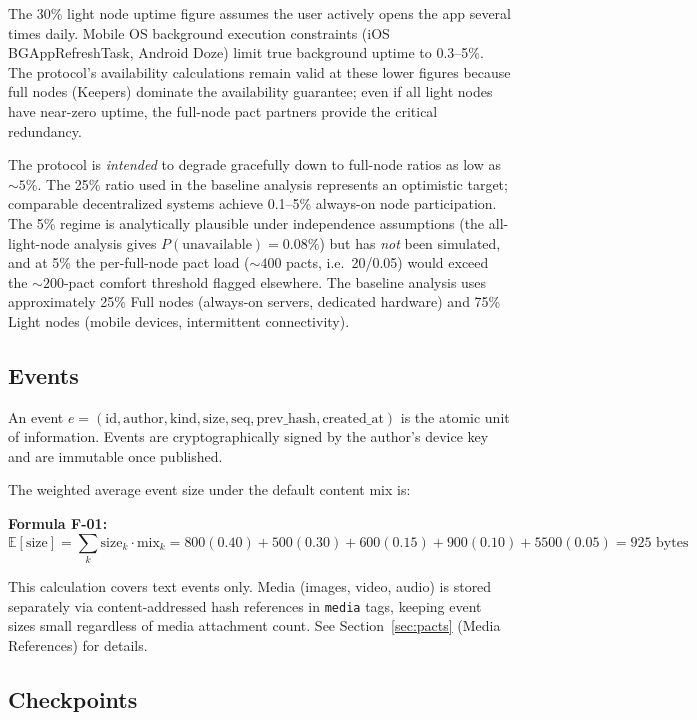 \documentclass[11pt,a4paper]{article}
\begin{document}
The 30\% light node uptime figure assumes the user actively opens the app several times daily. Mobile OS background execution constraints (iOS BGAppRefreshTask, Android Doze) limit true background uptime to 0.3--5\%. The protocol's availability calculations remain valid at these lower figures because full nodes (Keepers) dominate the availability guarantee; even if all light nodes have near-zero uptime, the full-node pact partners provide the critical redundancy.

The protocol is \emph{intended} to degrade gracefully down to full-node ratios as low as ${\sim}5\%$. The 25\% ratio used in the baseline analysis represents an optimistic target; comparable decentralized systems achieve 0.1--5\% always-on node participation. The 5\% regime is analytically plausible under independence assumptions (the all-light-node analysis gives $P(\text{unavailable}) = 0.08\%$) but has \emph{not} been simulated, and at 5\% the per-full-node pact load (${\sim}400$ pacts, i.e.\ 20/0.05) would exceed the ${\sim}200$-pact comfort threshold flagged elsewhere. The baseline analysis uses approximately 25\% Full nodes (always-on servers, dedicated hardware) and 75\% Light nodes (mobile devices, intermittent connectivity).

\subsection{Events}

An event $e = (\text{id}, \text{author}, \text{kind}, \text{size}, \text{seq}, \text{prev\_hash}, \text{created\_at})$ is the atomic unit of information. Events are cryptographically signed by the author's device key and are immutable once published.

The weighted average event size under the default content mix is:

\textbf{Formula F-01:}
\begin{equation}
  \mathbb{E}[\text{size}] = \sum_{k} \text{size}_k \cdot \text{mix}_k = 800(0.40) + 500(0.30) + 600(0.15) + 900(0.10) + 5500(0.05) = 925 \text{ bytes}
\end{equation}

This calculation covers text events only. Media (images, video, audio) is stored separately via content-addressed hash references in \texttt{media} tags, keeping event sizes small regardless of media attachment count. See Section~\ref{sec:pacts} (Media References) for details.

\subsection{Checkpoints}
\end{document}
